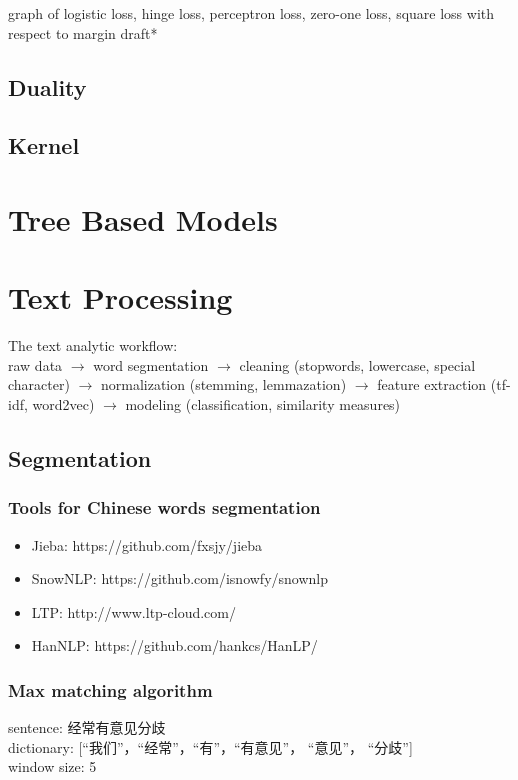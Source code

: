 \documentclass{report}
\begin{document}
graph of logistic loss, hinge loss, perceptron loss, zero-one loss, square loss with respect to margin draft*
\section{Duality}
\section{Kernel}
\chapter{Tree Based Models}

\chapter{Text Processing}
The text analytic workflow: \\ \linebreak
raw data $\rightarrow$ word segmentation $\rightarrow$ cleaning (stopwords, lowercase, special character) $\rightarrow$ normalization (stemming, lemmazation) $\rightarrow$ feature extraction (tf-idf, word2vec) $\rightarrow$ modeling (classification, similarity measures)

\section{Segmentation}
\subsection{Tools for Chinese words segmentation}
\begin{itemize}
	\item Jieba: https://github.com/fxsjy/jieba
	\item SnowNLP: https://github.com/isnowfy/snownlp
	\item LTP: http://www.ltp-cloud.com/
	\item HanNLP: https://github.com/hankcs/HanLP/
\end{itemize}

\subsection{Max matching algorithm}
{\noindent sentence: 经常有意见分歧}\\
dictionary: [“我们”，“经常”，“有”，“有意见”， “意见”， “分歧”]\\
window size: 5
\end{document}
